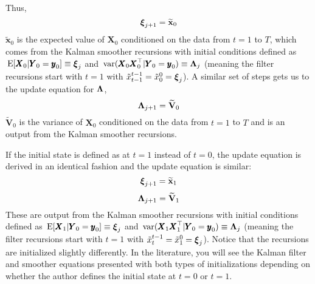 \documentclass[]{article}
\def\xixi{\mbox{\boldmath $\xi$}}
\def\LAM{\mbox{\boldmath $\Lambda$}}
\def\E{\,\textup{\textrm{E}}}
\def\VV{\mbox{$\mathbf V$}}	\def\vv{\mbox{$\mathbf v$}}
\def\XX{\mbox{$\pmb{X}$}}	\def\xx{\mbox{$\pmb{x}$}}
\def\YY{\mbox{$\pmb{Y}$}}	\def\yy{\mbox{$\pmb{y}$}}
\def\var{\,\textup{\textrm{var}}}
\begin{document}
Thus,
\begin{equation}\label{eq:pi.update.unconstrained}
\xixi_{j+1} = \widetilde{\mbox{$\mathbf x$}}_0
\end{equation}
$\widetilde{\mbox{$\mathbf x$}}_0$ is the expected value of $\XX_0$ conditioned on the data from $t=1$ to $T$, which comes from the Kalman smoother recursions with initial conditions defined as $\E[\XX_0|\YY_0=\yy_0] \equiv \xixi_j$ and $\var(\XX_0 \XX_0^\top|\YY_0=\yy_0)\equiv \LAM_j$ (meaning the filter recursions start with $t=1$ with  $\tilde{x}_{t-1}^{t-1} = \tilde{x}_0^0 = \xixi_j$).
A similar set of steps gets us to the update equation for $\LAM$,
\begin{equation}\label{eq:V0.update.unconstrained}
\LAM_{j+1} = \widetilde{\VV}_0
\end{equation}
$\widetilde{\VV}_0$ is the variance of $\XX_0$ conditioned on the data from $t=1$ to $T$ and is an output from the Kalman smoother recursions.

If the initial state is defined as at $t=1$ instead of $t=0$, the update equation is derived in an identical fashion and the update equation is similar:
\begin{equation}\label{eq:pix1.update.unconstrained}
\xixi_{j+1} = \widetilde{\mbox{$\mathbf x$}}_1
\end{equation}
\begin{equation}
\LAM_{j+1} = \widetilde{\VV}_1
\end{equation}
These are output from the Kalman smoother recursions with initial conditions defined as $\E[\XX_1|\YY_0=\yy_0] \equiv \xixi_j$ and $\var(\XX_1 \XX_1^\top|\YY_0=\yy_0)\equiv \LAM_j$  (meaning the filter recursions start with $t=1$ with  $\tilde{x}_{t}^{t-1} = \tilde{x}_1^0 = \xixi_j$).  Notice that the recursions are initialized slightly differently. In the literature, you will see the Kalman filter and smoother equations presented with both types of initializations depending on whether the author defines the initial state at $t=0$ or $t=1$.
\end{document}
